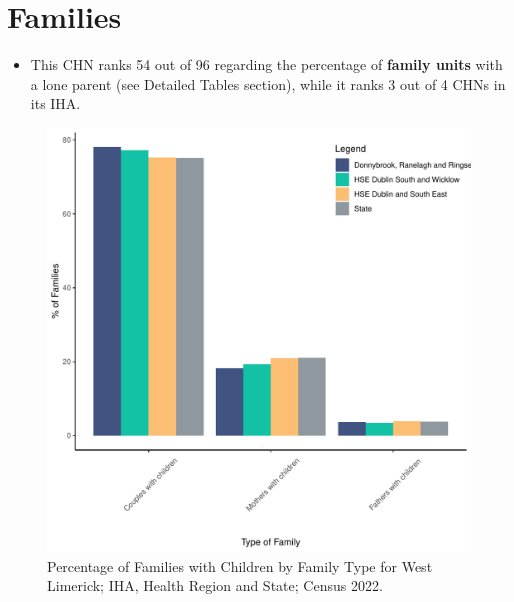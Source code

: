 \documentclass{article}
\begin{document}
\section{Families}\label{sect:Fam}
\begin{itemize}
\item This CHN ranks  54 out of 96 regarding the percentage of \textbf{family units} with a lone parent (see Detailed Tables section), while it ranks   3 out of 4 CHNs in its IHA.
\end{itemize}
\begin{figure}[H]
	\centering
	\includegraphics[width = 150mm]{../figures/FamED.pdf}
	\caption{Percentage of Families with Children by Family Type for West Limerick; IHA, Health Region and State; Census 2022.}
	\label{fig:vbnv}
	\end{figure}
	
\end{document}
